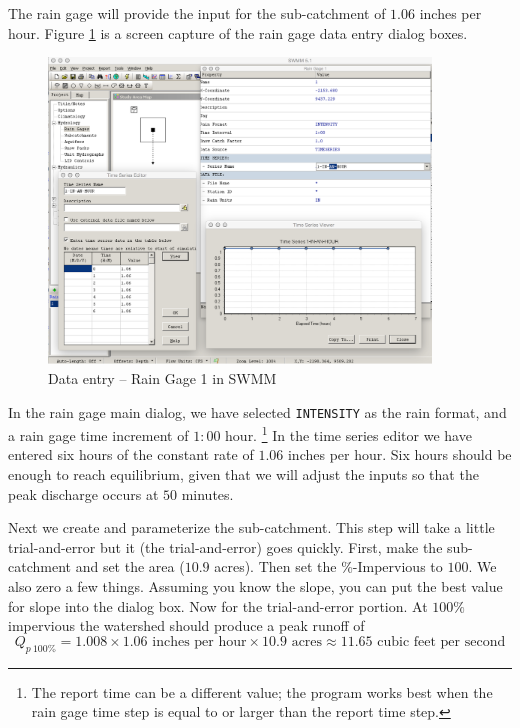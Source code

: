 \documentclass[12pt]{article}
\begin{document}
The rain gage will provide the input for the sub-catchment of $1.06$ inches per hour.
Figure \ref{fig:SWMMRainGage} is a screen capture of the rain gage data entry dialog boxes.

\begin{figure}[h!] %
   \centering
   \includegraphics[width=4in]{SWMMRainGage.jpg} 
   \caption{Data entry -- Rain Gage 1 in SWMM}
   \label{fig:SWMMRainGage}
\end{figure}

In the rain gage main dialog, we have selected \texttt{INTENSITY} as the rain format, and a rain gage time increment of $1:00$ hour.  
\footnote{The report time can be a different value; the program works best when the rain gage time step is equal to or larger than the report time step.}
In the time series editor we have entered six hours of the constant rate of $1.06$ inches per hour.   
Six hours should be enough to reach equilibrium, given that we will adjust the inputs so that the peak discharge occurs at $50$ minutes.

Next we create and parameterize the sub-catchment.  This step will take a little trial-and-error but it (the trial-and-error) goes quickly.   
First, make the sub-catchment and set the area ($10.9$ acres).
Then set the \%-Impervious to $100$.   
We also zero a few things.   
Assuming you know the slope, you can put the best value for slope into the dialog box.
Now for the trial-and-error portion.
At $100 \%$ impervious the watershed should produce a peak runoff of
\begin{equation}
Q_{p~100\%}=1.008 \times 1.06\text{ inches per hour} \times 10.9\text{ acres} \approx 11.65\text{ cubic feet per second}
\end{equation}
\end{document}
